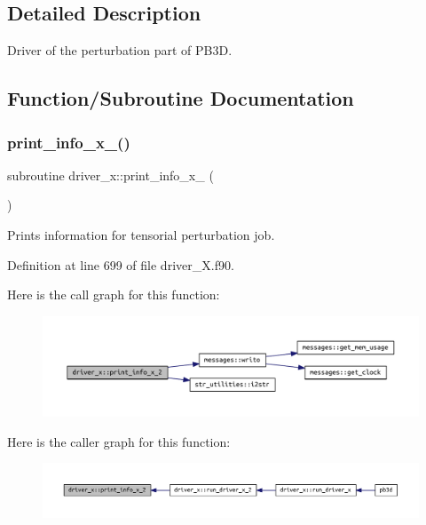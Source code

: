 \subsection{Detailed Description}
Driver of the perturbation part of P\+B3D. 

\subsection{Function/\+Subroutine Documentation}
\mbox{\label{namespacedriver__x_aca49d362e21df044e21d5ba4b2599cf4}} 
\subsubsection{\texorpdfstring{print\+\_\+info\+\_\+x\+\_()}{print\_info\_x\_2()}}
{\footnotesize\ttfamily subroutine driver\+\_\+x\+::print\+\_\+info\+\_\+x\+\_ (\begin{DoxyParamCaption}{ }\end{DoxyParamCaption})}



Prints information for tensorial perturbation job. 



Definition at line 699 of file driver\+\_\+\+X.\+f90.

Here is the call graph for this function\+:\nopagebreak
\begin{figure}[H]
\begin{center}
\leavevmode
\includegraphics[width=350pt]{namespacedriver__x_aca49d362e21df044e21d5ba4b2599cf4_cgraph}
\end{center}
\end{figure}
Here is the caller graph for this function\+:\nopagebreak
\begin{figure}[H]
\begin{center}
\leavevmode
\includegraphics[width=350pt]{namespacedriver__x_aca49d362e21df044e21d5ba4b2599cf4_icgraph}
\end{center}
\end{figure}
\mbox{\label{namespacedriver__x_ada3d72a0929daaa5e3da585246d62281}} 
